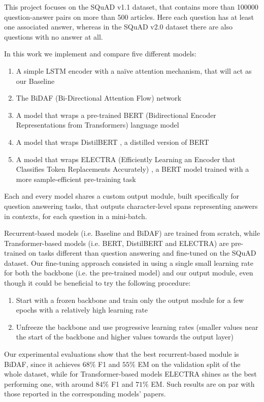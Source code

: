 \documentclass[a4paper,10pt]{report}
\begin{document}
This project focuses on the SQuAD v1.1 dataset, that contains more than \num{100000} question-answer pairs on more than \num{500} articles. Here each question has at least one associated answer, whereas in the SQuAD v2.0 dataset there are also questions with no answer at all.

In this work we implement and compare five different models:
\begin{enumerate}
  \item A simple LSTM encoder with a naïve attention mechanism, that will act as our Baseline
  \item The BiDAF (Bi-Directional Attention Flow) network \cite{bidaf}
  \item A model that wraps a pre-trained BERT (Bidirectional Encoder Representations from Transformers) language model \cite{bert}
  \item A model that wraps DistilBERT \cite{distilbert}, a distilled version of BERT
  \item A model that wraps ELECTRA (Efficiently Learning an Encoder that Classifies Token Replacements Accurately) \cite{electra}, a BERT model trained with a more sample-efficient pre-training task
\end{enumerate}
Each and every model shares a custom output module, built specifically for question answering tasks, that outputs character-level spans representing answers in contexts, for each question in a mini-batch.

Recurrent-based models (i.e. Baseline and BiDAF) are trained from scratch, while Transformer-based models (i.e. BERT, DistilBERT and ELECTRA) are pre-trained on tasks different than question answering and fine-tuned on the SQuAD dataset. Our fine-tuning approach consisted in using a single small learning rate for both the backbone (i.e. the pre-trained model) and our output module, even though it could be beneficial to try the following procedure:
\begin{enumerate}
  \item Start with a frozen backbone and train only the output module for a few epochs with a relatively high learning rate
  \item Unfreeze the backbone and use progressive learning rates (smaller values near the start of the backbone and higher values towards the output layer)
\end{enumerate}

Our experimental evaluations show that the best recurrent-based module is BiDAF, since it achieves $68\%$ F1 and $55\%$ EM on the validation split of the whole dataset, while for Transformer-based models ELECTRA shines as the best performing one, with around $84\%$ F1 and $71\%$ EM. Such results are on par with those reported in the corresponding models' papers.
\end{document}
